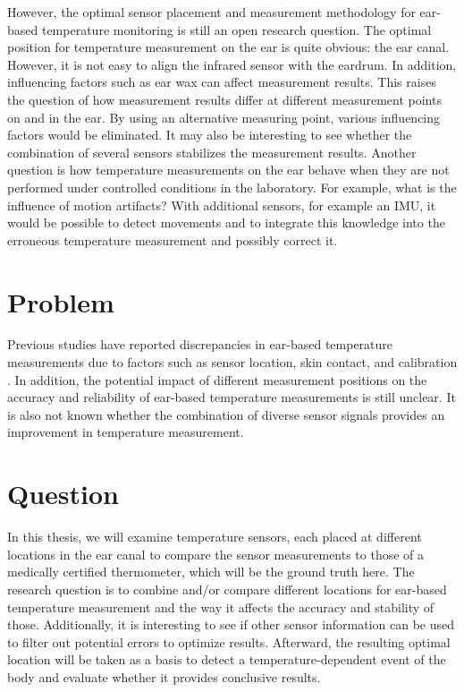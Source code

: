 However, the optimal sensor placement and measurement methodology for ear-based temperature monitoring is still an open research question. 
The optimal position for temperature measurement on the ear is quite obvious: the ear canal. 
However, it is not easy to align the infrared sensor with the eardrum. In addition, influencing factors such as ear wax can affect measurement results. 
This raises the question of how measurement results differ at different measurement points on and in the ear. 
By using an alternative measuring point, various influencing factors would be eliminated.
It may also be interesting to see whether the combination of several sensors stabilizes the measurement results.
Another question is how temperature measurements on the ear behave when they are not performed under controlled conditions in the laboratory.
For example, what is the influence of motion artifacts?
With additional sensors, for example an IMU, it would be possible to detect movements and to integrate this knowledge into the erroneous temperature measurement and possibly correct it.

\section{Problem}
Previous studies have reported discrepancies in ear-based temperature measurements due to factors such as sensor location, skin contact, and calibration \cite{rohrbergTemperatureMeasurementEar1997, gasimAccuracyTympanicTemperature2013, amoateng-adjepongAccuracyInfraredTympanic1999a, hookerScreeningFeverAdult1996a, cattaneoAccuracyPrecisionBody2000}. 
In addition, the potential impact of different measurement positions on the accuracy and reliability of ear-based temperature measurements is still unclear.
It is also not known whether the combination of diverse sensor signals provides an improvement in temperature measurement.

\section{Question}
In this thesis, we will examine temperature sensors, each placed at different locations in the ear canal to compare the sensor measurements to those of a medically certified thermometer, which will be the ground truth here. 
The research question is to combine and/or compare different locations for ear-based temperature measurement and the way it affects the accuracy and stability of those. 
Additionally, it is interesting to see if other sensor information can be used to filter out potential errors to optimize results.
Afterward, the resulting optimal location will be taken as a basis to detect a temperature-dependent event of the body and evaluate whether it provides conclusive results.

